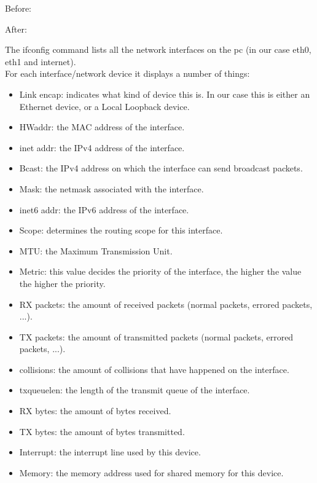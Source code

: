 Before: \newline

\newline
After: \newline


\newline
The ifconfig command lists all the network interfaces on the pc (in our case eth0, eth1 and internet). \\

For each interface/network device it displays a number of things:
\begin{itemize}
	\item Link encap: indicates what kind of device this is. In our case this is either an Ethernet device, or a Local Loopback device.
	\item HWaddr: the MAC address of the interface.
	\item inet addr: the IPv4 address of the interface.
	\item Bcast: the IPv4 address on which the interface can send broadcast packets.
	\item Mask: the netmask associated with the interface.
	\item inet6 addr: the IPv6 address of the interface.
	\item Scope: determines the routing scope for this interface. 
	\item MTU: the Maximum Transmission Unit.
	\item Metric: this value decides the priority of the interface, the higher the value the higher the priority.
	\item RX packets: the amount of received packets (normal packets, errored packets, ...).
	\item TX packets: the amount of transmitted packets (normal packets, errored packets, ...).
	\item collisions: the amount of collisions that have happened on the interface.
	\item txqueuelen: the length of the transmit queue of the interface.
	\item RX bytes: the amount of bytes received.
	\item TX bytes: the amount of bytes transmitted.
	\item Interrupt: the interrupt line used by this device.
	\item Memory: the memory address used for shared memory for this device.
\end{itemize}
